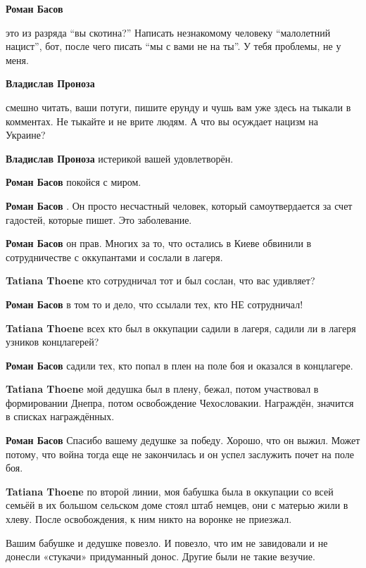 \begin{itemize}
\begin{itemize}
\begin{itemize}
\textbf{Роман Басов} 

это из разряда \enquote{вы скотина?} Написать незнакомому человеку \enquote{малолетний нацист},
бот, после чего писать \enquote{мы с вами не на ты}. У тебя проблемы, не у меня.


\textbf{Владислав Проноза} 

смешно читать, ваши потуги, пишите ерунду и чушь вам уже здесь на тыкали в
комментах. Не тыкайте и не врите людям. А что вы осуждает нацизм на Украине?


\textbf{Владислав Проноза} истерикой вашей удовлетворён.

\textbf{Роман Басов} покойся с миром.

\textbf{Роман Басов} . Он просто несчастный человек, который самоутвердается за счет гадостей, которые пишет. Это заболевание.

\textbf{Роман Басов} он прав. Многих за то, что остались в Киеве обвинили в сотрудничестве с оккупантами и сослали в лагеря.

\textbf{Tatiana Thoene} кто сотрудничал тот и был сослан, что вас удивляет?

\textbf{Роман Басов} в том то и дело, что ссылали тех, кто НЕ сотрудничал!

\textbf{Tatiana Thoene} всех кто был в оккупации садили в лагеря, садили ли в лагеря узников концлагерей?

\textbf{Роман Басов} садили тех, кто попал в плен на поле боя и оказался в концлагере.

\textbf{Tatiana Thoene} мой дедушка был в плену, бежал, потом участвовал в формировании Днепра, потом освобождение Чехословакии. Награждён, значится в списках награждённых.

\textbf{Роман Басов} Спасибо вашему дедушке за победу. Хорошо, что он выжил. Может потому, что война тогда еще не закончилась и он успел заслужить почет на поле боя.

\textbf{Tatiana Thoene} по второй линии, моя бабушка была в оккупации со всей семьёй в их большом сельском доме стоял штаб немцев, они с матерью жили в хлеву. После освобождения, к ним никто на воронке не приезжал.

Вашим бабушке и дедушке повезло. И повезло, что им не завидовали и не донесли «стукачи» придуманный донос. Другие были не такие везучие.


\end{itemize}
\end{itemize}
\end{itemize}
